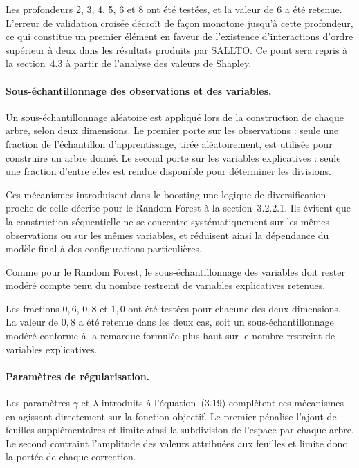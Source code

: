 Les profondeurs 2, 3, 4, 5, 6 et 8 ont été testées, et la valeur de 6 a été
retenue. L'erreur de validation croisée décroît de façon monotone jusqu'à
cette profondeur, ce qui constitue un premier élément en faveur de
l'existence d'interactions d'ordre supérieur à deux dans les résultats
produits par SALLTO. Ce point sera repris à la section~4.3 à partir de
l'analyse des valeurs de Shapley.

\paragraph{Sous-échantillonnage des observations et des variables.}
Un sous-échantillonnage aléatoire est appliqué lors de la construction de chaque arbre, 
selon deux dimensions. Le premier porte sur les observations : seule une fraction de 
l'échantillon d'apprentissage, tirée aléatoirement, est utilisée pour construire un arbre 
donné. Le second porte sur les variables explicatives : seule une fraction d'entre elles 
est rendue disponible pour déterminer les divisions.

Ces mécanismes introduisent dans le boosting une logique de diversification proche de 
celle décrite pour le Random Forest à la section~3.2.2.1. Ils évitent que la construction 
séquentielle ne se concentre systématiquement sur les mêmes observations ou sur les mêmes 
variables, et réduisent ainsi la dépendance du modèle final à des configurations 
particulières.

Comme pour le Random Forest, le sous-échantillonnage des variables doit rester modéré 
compte tenu du nombre restreint de variables explicatives retenues.

Les fractions \(0{,}6\), \(0{,}8\) et \(1{,}0\) ont été testées pour chacune
des deux dimensions. La valeur de \(0{,}8\) a été retenue dans les deux cas,
soit un sous-échantillonnage modéré conforme à la remarque formulée plus haut
sur le nombre restreint de variables explicatives.

\paragraph{Paramètres de régularisation.}
Les paramètres $\gamma$ et $\lambda$ introduits à l'équation~(3.19) complètent ces 
mécanismes en agissant directement sur la fonction objectif. Le premier pénalise l'ajout 
de feuilles supplémentaires et limite ainsi la subdivision de l'espace par chaque arbre. 
Le second contraint l'amplitude des valeurs attribuées aux feuilles et limite donc la 
portée de chaque correction.

